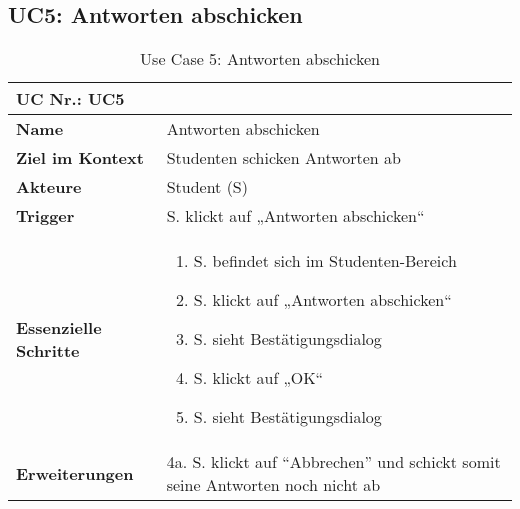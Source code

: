 \begin{table}[h]
\subsection{UC5: Antworten abschicken}\label{uc:UC5}
	\begin{tabular}{|p{3cm}|p{11.06cm}|}
	\hline
		\multicolumn{2}{|l|}{\textbf{UC Nr.: UC5} }   \\ \hline
		\textbf{Name}                 &     Antworten abschicken    \\ \hline
		\textbf{Ziel im Kontext}      &     Studenten schicken Antworten ab    \\ \hline
		\textbf{Akteure}              &     Student (S)    \\ \hline
		\textbf{Trigger}              &     S. klickt auf „Antworten abschicken“    \\ \hline
		\textbf{Essenzielle Schritte} & 
			\begin{enumerate}
			  \item S. befindet sich im Studenten-Bereich
			  \item S. klickt auf „Antworten abschicken“
			  \item S. sieht Bestätigungsdialog
			  \item S. klickt auf „OK“
			  \item S. sieht Bestätigungsdialog
			\end{enumerate}
		\\ \hline
		\textbf{Erweiterungen} 		  &   4a. S. klickt auf "`Abbrechen"' und schickt somit seine Antworten noch nicht ab     \\ \hline
	\end{tabular}
	\caption{Use Case 5: Antworten abschicken}
\end{table}\FloatBarrier




